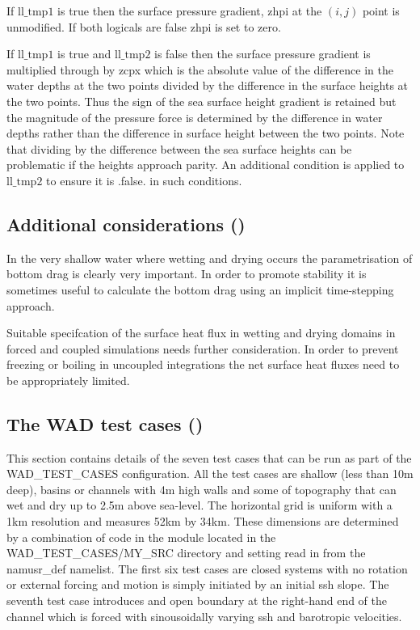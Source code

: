 If $\mathrm{ll\_tmp1}$ is true then the surface pressure gradient, zhpi at the $(i,j)$
point is unmodified. If both logicals are false zhpi is set to zero.

If $\mathrm{ll\_tmp1}$ is true and $\mathrm{ll\_tmp2}$ is false then the surface pressure
gradient is multiplied through by zcpx which is the absolute value of the difference in
the water depths at the two points divided by the difference in the surface heights at the
two points. Thus the sign of the sea surface height gradient is retained but the magnitude
of the pressure force is determined by the difference in water depths rather than the
difference in surface height between the two points. Note that dividing by the difference
between the sea surface heights can be problematic if the heights approach parity. An
additional condition is applied to $\mathrm{ ll\_tmp2 }$ to ensure it is .false. in such
conditions.

\subsection   [Additional considerations (\textit{usrdef\_zgr})]
			{Additional considerations ()}
\label{WAD_additional}

In the very shallow water where wetting and drying occurs the parametrisation of 
bottom drag is clearly very important. In order to promote stability  
it is sometimes useful to calculate the bottom drag using an implicit time-stepping approach.  

Suitable specifcation of the surface heat flux in wetting and drying domains in forced and 
coupled simulations needs further consideration. In order to prevent freezing or boiling
in uncoupled integrations the net surface heat fluxes need to be appropriately limited.  
 
\subsection   [The WAD test cases (\textit{usrdef\_zgr})]
			{The WAD test cases ()}
\label{WAD_test_cases}

This section contains details of the seven test cases that can be run as part of the
WAD\_TEST\_CASES configuration. All the test cases are shallow (less than 10m deep),
basins or channels with 4m high walls and some of topography that can wet and dry up to
2.5m above sea-level. The horizontal grid is uniform with a 1km resolution and measures
52km by 34km. These dimensions are determined by a combination of code in the
 module located in the WAD\_TEST\_CASES/MY\_SRC directory and setting
read in from the namusr\_def namelist. The first six test cases are closed systems with no
rotation or external forcing and motion is simply initiated by an initial ssh slope. The
seventh test case introduces and open boundary at the right-hand end of the channel which
is forced with sinousoidally varying ssh and barotropic velocities.

